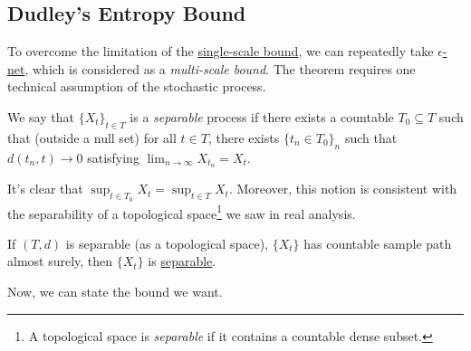 \subsection{Dudley's Entropy Bound}
To overcome the limitation of the \hyperref[lma:single-scale-bound]{single-scale bound}, we can repeatedly take \hyperref[def:eps-net]{\(\epsilon\)-net}, which is considered as a \emph{multi-scale bound}. The theorem requires one technical assumption of the stochastic process.

\begin{definition}[Separable]\label{def:separable}
	We say that \(\{X_t\}_{t\in T}\) is a \emph{separable} process if there exists a countable \(T_0 \subseteq T\) such that (outside a null set) for all \(t\in T\), there exists \(\{t_n \in T_0\}_{n}\) such that \(d(t_n, t) \to 0\) satisfying \(\lim_{n \to \infty} X_{t_n} = X_t\).
\end{definition}

It's clear that \(\sup _{t\in T_0} X_t = \sup _{t\in T} X_t\). Moreover, this notion is consistent with the separability of a topological space\footnote{A topological space is \emph{separable} if it contains a countable dense subset.} we saw in real analysis.

\begin{eg}
	If \((T, d)\) is separable (as a topological space), \(\{ X_t \} \) has countable sample path almost surely, then \(\{ X_t \} \) is \hyperref[def:separable]{separable}.
\end{eg}

Now, we can state the bound we want.

